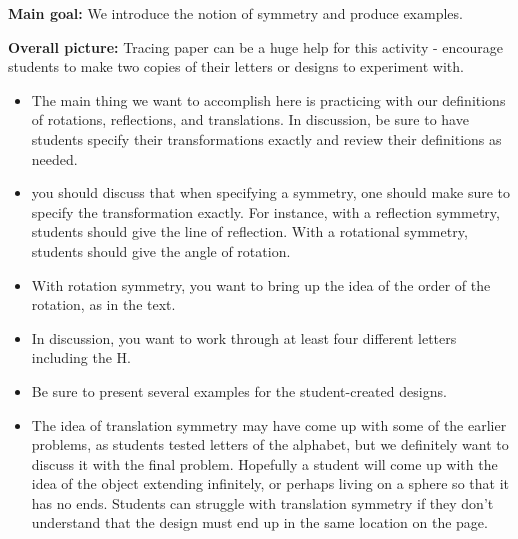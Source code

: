 \documentclass{ximera}
\begin{document}
\newpage
\begin{instructorNotes}

{\bf Main goal:} We introduce the notion of symmetry and produce examples.

{\bf Overall picture:} Tracing paper can be a huge help for this activity - encourage students to make two copies of their letters or designs to experiment with.

\begin{itemize}
	\item The main thing we want to accomplish here is practicing with our definitions of rotations, reflections, and translations. In discussion, be sure to have students specify their transformations exactly and review their definitions as needed.
	\item you should discuss that when specifying a symmetry, one should make sure to specify the transformation exactly.  For instance, with a reflection symmetry, students should give the line of reflection.  With a rotational symmetry, students should give the angle of rotation.
	\item With rotation symmetry, you want to bring up the idea of the order of the rotation, as in the text.
	\item In discussion, you want to work through at least four different letters including the H.
	\item Be sure to present several examples for the student-created designs.
	\item The idea of translation symmetry may have come up with some of the earlier problems, as students tested letters of the alphabet, but we definitely want to discuss it with the final problem. Hopefully a student will come up with the idea of the object extending infinitely, or perhaps living on a sphere so that it has no ends. Students can struggle with translation symmetry if they don't understand that the design must end up in the same location on the page. 
\end{itemize}


\end{instructorNotes}
\end{document}
